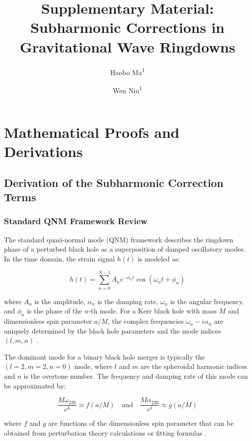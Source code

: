 \documentclass[a4paper,12pt]{article}
\title{Supplementary Material: Subharmonic Corrections in Gravitational Wave Ringdowns}
\author{Haobo Ma\textsuperscript{1} \and Wen Niu\textsuperscript{1}}
\date{\vspace{-5ex}}
\begin{document}
\maketitle

\tableofcontents

\section{Mathematical Proofs and Derivations}
\label{sec:math_proofs}

\subsection{Derivation of the Subharmonic Correction Terms}
\label{subsec:subharmonic_derivation}

\subsubsection{Standard QNM Framework Review}

The standard quasi-normal mode (QNM) framework describes the ringdown phase of a perturbed black hole as a superposition of damped oscillatory modes. In the time domain, the strain signal $h(t)$ is modeled as:

\begin{equation}
h(t) = \sum_{n=0}^{N-1} A_n e^{-\alpha_n t} \cos(\omega_n t + \phi_n)
\end{equation}

where $A_n$ is the amplitude, $\alpha_n$ is the damping rate, $\omega_n$ is the angular frequency, and $\phi_n$ is the phase of the $n$-th mode. For a Kerr black hole with mass $M$ and dimensionless spin parameter $a/M$, the complex frequencies $\omega_n - i\alpha_n$ are uniquely determined by the black hole parameters and the mode indices $(l,m,n)$ \cite{berti2009quasinormal}.

The dominant mode for a binary black hole merger is typically the $(l=2,m=2,n=0)$ mode, where $l$ and $m$ are the spheroidal harmonic indices and $n$ is the overtone number. The frequency and damping rate of this mode can be approximated by:

\begin{equation}
\frac{M\omega_{220}}{c^3} \approx f(a/M) \quad \textrm{and} \quad \frac{M\alpha_{220}}{c^3} \approx g(a/M)
\end{equation}

where $f$ and $g$ are functions of the dimensionless spin parameter that can be obtained from perturbation theory calculations or fitting formulas \cite{yang2012quasinormal}.
\end{document}
